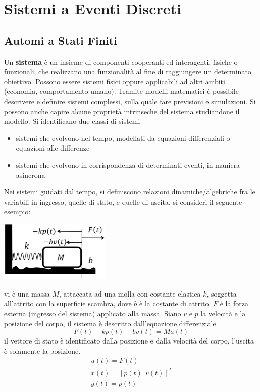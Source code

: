 \documentclass[10pt, letterpaper]{report}
\begin{document}
\chapter{Sistemi a Eventi Discreti}
\section{Automi a Stati Finiti}
 Un \textbf{sistema} è un insieme di componenti cooperanti ed interagenti, fisiche o funzionali, che realizzano una funzionalità al fine di raggiungere un determinato obiettivo. Possono essere sistemi fisici oppure applicabili ad altri ambiti (economia, comportamento umano).\acc 
Tramite modelli matematici è possibile descrivere e definire sistemi complessi, sulla quale fare previsioni e simulazioni. Si possono anche  capire alcune proprietà intrinseche del sistema studiandone il modello. Si identificano due classi di sistemi\begin{itemize}
    \item sistemi che evolvono nel tempo, modellati da equazioni differenziali o equazioni alle differenze 
    \item sistemi che evolvono in corrispondenza di determinati eventi, in maniera asincrona
\end{itemize}
Nei sistemi guidati dal tempo, si definiscono relazioni dinamiche/algebriche fra le variabili in ingresso, quelle di stato, e quelle di uscita, si consideri il seguente esempio:
\begin{center}
    \includegraphics[width=0.4\textwidth]{images/mollaMassa.pdf}
\end{center}
vi è una massa $M$, attaccata ad una molla con costante elastica $k$, soggetta all'attrito con la superficie scambra, dove $b$ è la costante di attrito. $F$ è la forza esterna (ingresso del sistema) applicato alla massa. Siano $v$ e $p$ la velocità e la posizione del corpo, il sistema è descritto dall'equazione differenziale 
$$ F(t)-kp(t)-bv(t)=Ma(t)$$
il vettore di stato è identificato dalla posizione e dalla velocità del corpo, l'uscita è solamente la posizione. 
$$ \begin{matrix}
    u(t)=F(t)\\ 
    x(t)=[p(t) \ \ v(t)]^T\\ 
    y(t)=p(t)
\end{matrix}$$
\end{document}
